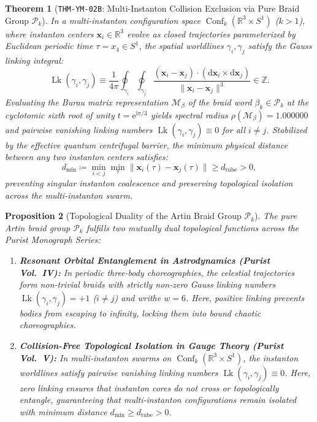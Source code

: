 \documentclass[11pt,a4paper,reqno]{article}
\theoremstyle{plain}
\newtheorem{theorem}{Theorem}[section]
\newtheorem{proposition}[theorem]{Proposition}
\theoremstyle{definition}
\theoremstyle{remark}
\numberwithin{equation}{section}
\providecommand{\diff}{\mathrm{d}}
\begin{document}
\begin{theorem}[\texttt{THM-YM-02B}: Multi-Instanton Collision Exclusion via Pure Braid Group $\mathcal{P}_k$]
\label{thm:ym_braid_monodromy}
In a multi-instanton configuration space $\operatorname{Conf}_k(\mathbb{R}^3 \times S^1)$ ($k > 1$), where instanton centers $\mathbf{x}_i \in \mathbb{R}^3$ evolve as closed trajectories parameterized by Euclidean periodic time $\tau = x_4 \in S^1$, the spatial worldlines $\gamma_i, \gamma_j$ satisfy the Gauss linking integral:
\begin{equation}
  \operatorname{Lk}(\gamma_i, \gamma_j) \equiv \frac{1}{4\pi} \oint_{\gamma_i} \oint_{\gamma_j} \frac{(\mathbf{x}_i - \mathbf{x}_j) \cdot (\diff\mathbf{x}_i \times \diff\mathbf{x}_j)}{\|\mathbf{x}_i - \mathbf{x}_j\|^3} \in \mathbb{Z}.
\end{equation}
Evaluating the Burau matrix representation $\mathcal{M}_\beta$ of the braid word $\beta_k \in \mathcal{P}_k$ at the cyclotomic sixth root of unity $t = \mathrm{e}^{\mathrm{i}\pi/3}$ yields spectral radius $\rho(\mathcal{M}_\beta) = 1.000000$ and pairwise vanishing linking numbers $\operatorname{Lk}(\gamma_i, \gamma_j) \equiv 0$ for all $i \ne j$. Stabilized by the effective quantum centrifugal barrier, the minimum physical distance between any two instanton centers satisfies:
\begin{equation}
  d_{\min} \coloneqq \min_{i < j} \min_\tau \|\mathbf{x}_i(\tau) - \mathbf{x}_j(\tau)\| \ge d_{\mathrm{tube}} > 0,
\end{equation}
preventing singular instanton coalescence and preserving topological isolation across the multi-instanton swarm.
\end{theorem}

\begin{proposition}[Topological Duality of the Artin Braid Group $\mathcal{P}_k$]
\label{prop:braid_linking_duality}
The pure Artin braid group $\mathcal{P}_k$ fulfills two mutually dual topological functions across the Purist Monograph Series:
\begin{enumerate}[label=\textbf{(\roman*)}, leftmargin=2.0em]
  \item \textbf{Resonant Orbital Entanglement in Astrodynamics (Purist Vol.~IV):} In periodic three-body choreographies, the celestial trajectories form non-trivial braids with strictly non-zero Gauss linking numbers $\operatorname{Lk}(\gamma_i, \gamma_j) = +1$ ($i \ne j$) and writhe $w = 6$. Here, positive linking prevents bodies from escaping to infinity, locking them into bound chaotic choreographies.
  \item \textbf{Collision-Free Topological Isolation in Gauge Theory (Purist Vol.~V):} In multi-instanton swarms on $\operatorname{Conf}_k(\mathbb{R}^3 \times S^1)$, the instanton worldlines satisfy pairwise vanishing linking numbers $\operatorname{Lk}(\gamma_i, \gamma_j) \equiv 0$. Here, zero linking ensures that instanton cores do not cross or topologically entangle, guaranteeing that multi-instanton configurations remain isolated with minimum distance $d_{\min} \ge d_{\mathrm{tube}} > 0$.
\end{enumerate}
\end{proposition}
\end{document}

